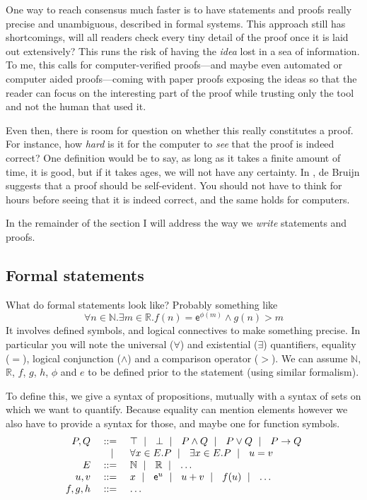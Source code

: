 One way to reach consensus much faster is to have statements and proofs really
precise and unambiguous, described in formal systems. This approach still has
shortcomings, will all readers check every tiny detail of the proof once it is
laid out extensively? This runs the risk of having the \emph{idea} lost in a
sea of information.
To me, this calls for computer-verified proofs---and maybe even automated or
computer aided proofs---coming with paper proofs exposing the ideas
so that the reader can focus on the interesting part of
the proof while trusting only the tool and not the human that used it.

Even then, there is room for question on whether this really constitutes a
proof.
For instance, how \emph{hard} is it for the computer to \emph{see} that the
proof is indeed correct? One definition would be to say, as long as it takes
a finite amount of time, it is good, but if it takes ages, we will not have any
certainty. In , de Bruijn suggests that a proof should be
self-evident. You should not have to think for hours before seeing that it is
indeed correct, and the same holds for computers.

In the remainder of the section I will address the way we \emph{write}
statements and proofs.

\subsection{Formal statements}

What do formal statements look like? Probably something like
\[
  \forall n \in \mathbb{N}. \exists m \in \mathbb{R}.
  f(n) = \mathsf{e}^{\phi(m)} \wedge g(n) > m
\]
It involves defined symbols, and logical connectives to make something precise.
In particular you will note the universal (\(\forall\)) and existential
(\(\exists\)) quantifiers, equality (\(=\)), logical conjunction (\(\wedge\))
and a comparison operator (\(>\)).
We can assume \(\mathbb{N}\), \(\mathbb{R}\), \(f\), \(g\), \(h\), \(\phi\) and
\(e\) to be defined prior to the statement (using similar formalism).

To define this, we give a syntax of propositions, mutually with a syntax of
sets on which we want to quantify. Because equality can mention elements however
we also have to provide a syntax for those, and maybe one for function symbols.
\[
  \begin{array}{rrl}
    P, Q &\ \mathrel{{:}{:}{=}}\ & \top \ \mid\ \  \bot \ \mid\ \  P \wedge Q \ \mid\ \  P \vee Q
    \ \mid\ \  P \to Q \\
    &\ \mid\ \ & \forall x \in E. P \ \mid\ \  \exists x \in E. P \ \mid\ \  u = v \\
    E &\ \mathrel{{:}{:}{=}}\ & \mathbb{N} \ \mid\ \  \mathbb{R} \ \mid\ \  \dots \\
    u, v &\ \mathrel{{:}{:}{=}}\ & x \ \mid\ \  \mathsf{e}^u \ \mid\ \  u + v \ \mid\ \  f(u) \ \mid\ \  \dots \\
    f, g, h &\ \mathrel{{:}{:}{=}}\ & \dots
  \end{array}
\]

